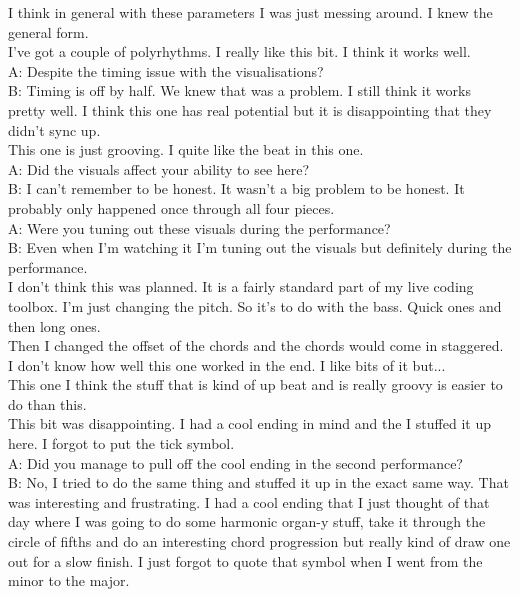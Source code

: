 I think in general with these parameters I was just messing around. I knew the general form.\\

I've got a couple of polyrhythms. I really like this bit. I think it works well.\\

A: Despite the timing issue with the visualisations?\\

B: Timing is off by half. We knew that was a problem. I still think it works pretty well. I think this one has real potential but it is disappointing that they didn't sync up.\\

This one is just grooving. I quite like the beat in this one.\\

A: Did the visuals affect your ability to see here?\\

B: I can't remember to be honest. It wasn't a big problem to be honest. It probably only happened once through all four pieces.\\

A: Were you tuning out these visuals during the performance?\\

B: Even when I'm watching it I'm tuning out the visuals but definitely during the performance.\\

I don't think this was planned. It is a fairly standard part of my live coding toolbox. I'm just changing the pitch. So it's to do with the bass. Quick ones and then long ones.\\

Then I changed the offset of the chords and the chords would come in staggered. I don't know how well this one worked in the end. I like bits of it but...\\

This one I think the stuff that is kind of up beat and is really groovy is easier to do than this.\\

This bit was disappointing. I had a cool ending in mind and the I stuffed it up here. I forgot to put the tick symbol.\\

A: Did you manage to pull off the cool ending in the second performance?\\

B: No, I tried to do the same thing and stuffed it up in the exact same way. That was interesting and frustrating. I had a cool ending that I just thought of that day where I was going to do some harmonic organ-y stuff, take it through the circle of fifths and do an interesting chord progression but really kind of draw one out for a slow finish. I just forgot to quote that symbol when I went from the minor to the major.\\

